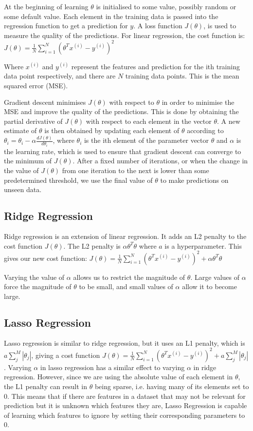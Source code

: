 \documentclass[10pt]{article}
\begin{document}
		At the beginning of learning $\theta$ is initialised to some value, possibly random or some default value. Each element in the training data is passed into the regression function to get a prediction for $y$. A loss function $J(\theta)$, is used to measure the quality of the predictions. For linear regression, the cost function is: $J(\theta) = \frac{1}{N}\sum_{i=1}^{N}(\theta^{T}x^{(i)} - y^{(i)})^2$
		
		Where $x^{(i)}$ and $y^{(i)}$ represent the features and prediction for the ith training data point respectively, and there are $N$ training data points. This is the mean squared error (MSE). 
		
		Gradient descent minimises $J(\theta)$ with respect to $\theta$ in order to minimise the MSE and improve the quality of the predictions. This is done by obtaining the partial derivative of $J(\theta)$ with respect to each element in the vector $\theta$. A new estimate of $\theta$ is then obtained by updating each element of $\theta$ according to $\theta_i = \theta_i - \alpha \frac{dJ(\theta)}{d\theta_i}$, where $\theta_i$ is the ith element of the parameter vector $\theta$ and $\alpha$ is the learning rate, which is used to ensure that gradient descent can converge to the minimum of $J(\theta)$. After a fixed number of iterations, or when the change in the value of $J(\theta)$ from one iteration to the next is lower than some predetermined threshold, we use the final value of $\theta$ to make predictions on unseen data.
		
	\subsection{Ridge Regression}
		Ridge regression is an extension of linear regression. It adds an L2 penalty to the cost function $J(\theta)$. The L2 penalty is $\alpha \theta^T \theta$ where $a$ is a hyperparameter. This gives our new cost function: $J(\theta) = \frac{1}{N}\sum_{i=1}^{N}(\theta^{T}x^{(i)} - y^{(i)})^2 + \alpha \theta^T \theta$
		
		Varying the value of $\alpha$ allows us to restrict the magnitude of $\theta$. Large values of $\alpha$ force the magnitude of $\theta$ to be small, and small values of $\alpha$ allow it to become large.
		
	\subsection{Lasso Regression}
		Lasso regression is similar to ridge regression, but it uses an L1 penalty, which is $a\sum_{j}^{M}|\theta_j|$, giving a cost function $J(\theta) = \frac{1}{N}\sum_{i=1}^{N}(\theta^{T}x^{(i)} - y^{(i)})^2 + a\sum_{j}^{M}|\theta_j|$. Varying $\alpha$ in lasso regression has a similar effect to varying $\alpha$ in ridge regression. However, since we are using the absolute value of each element in $\theta$, the L1 penalty can result in $\theta$ being sparse, i.e. having many of its elements set to 0. This means that if there are features in a dataset that may not be relevant for prediction but it is unknown which features they are, Lasso Regression is capable of learning which features to ignore by setting their corresponding parameters to 0.
	
\end{document}
